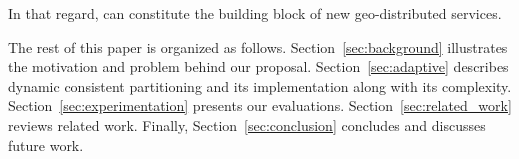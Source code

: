\noindent In that regard, \NAME can constitute the building block of
new geo-distributed services.


The rest of this paper is organized as
follows. Section~\ref{sec:background} illustrates the motivation and
problem behind our proposal.  Section~\ref{sec:adaptive} describes
dynamic consistent partitioning and its implementation along with its
complexity. Section~\ref{sec:experimentation} presents our
evaluations.  Section~\ref{sec:related_work} reviews related
work. Finally, Section~\ref{sec:conclusion} concludes and discusses
future work.
  


